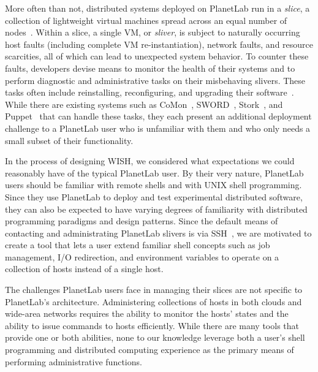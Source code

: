  \label{sec:motivation}

More often than not, distributed systems deployed on PlanetLab run in a
\textit{slice}, a collection of lightweight virtual machines spread across an
equal number of nodes~\cite{PlanetLab-architecture}.  Within a slice, a single
VM, or \textit{sliver}, is subject to naturally occurring  host faults
(including complete VM re-instantiation), network faults, and resource
scarcities, all of which can lead to unexpected system behavior.  To counter
these faults, developers devise means to monitor the health of their systems
and to perform diagnostic and administrative tasks on their misbehaving
slivers. These tasks often include reinstalling, reconfiguring, and upgrading
their software~\cite{PlanetLab-website}.  While there are existing systems
such as CoMon~\cite{CoMon}, SWORD~\cite{SWORD}, Stork~\cite{Stork}, and
Puppet~\cite{Puppet} that can handle these tasks, they each present an
additional deployment challenge to a PlanetLab user who is unfamiliar with
them and who only needs a small subset of their functionality.

In the process of designing WISH, we considered what expectations we could
reasonably have of the typical PlanetLab user. 
By their very nature, PlanetLab users should be familiar with remote shells and
with UNIX shell programming.  Since they use PlanetLab to deploy and test
experimental distributed software, they can also be expected to have varying
degrees of familiarity with distributed programming paradigms and
design patterns.  Since the default means of contacting and
administrating PlanetLab slivers is via SSH~\cite{PlanetLab-architecture}, we
are motivated to create a tool that lets a user extend familiar shell concepts
such as job management, I/O redirection, and environment variables to operate
on a collection of hosts instead of a single host.

The challenges PlanetLab users face in managing their slices are not specific
to PlanetLab's architecture.  Administering collections of hosts in both
clouds and wide-area networks requires the ability to monitor the hosts'
states and the ability to issue commands to hosts efficiently.  While there are
many tools that provide one or both abilities, none to our knowledge leverage
both a user's shell programming and distributed computing experience as the primary
means of performing administrative functions.
